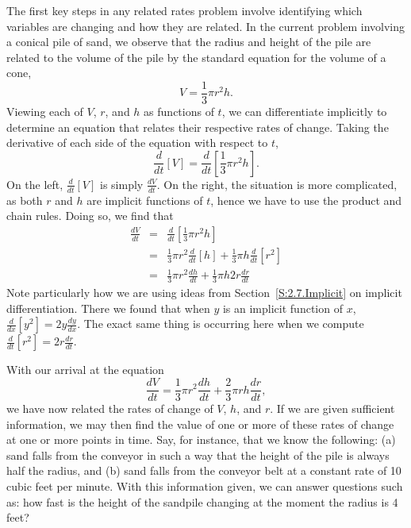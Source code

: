 The first key steps in any related rates problem involve identifying which variables are changing and how they are related.  In the current problem involving a conical pile of sand, we observe that the radius and height of the pile are related to the volume of the pile by the standard equation for the volume of a cone,
$$V = \frac{1}{3} \pi r^2 h.$$
Viewing each of $V$, $r$, and $h$ as functions of $t$, we can differentiate implicitly to determine an equation that relates their respective rates of change.  Taking the derivative of each side of the equation with respect to $t$, 
$$\frac{d}{dt}[V] = \frac{d}{dt}\left[\frac{1}{3} \pi r^2 h\right].$$
On the left, $\frac{d}{dt}[V]$ is simply $\frac{dV}{dt}$.  On the right, the situation is more complicated, as both $r$ and $h$ are implicit functions of $t$, hence we have to use the product and chain rules.  Doing so, we find that
\begin{eqnarray*}
\frac{dV}{dt} & = & \frac{d}{dt}\left[\frac{1}{3} \pi r^2 h\right] \\
		 & = & \frac{1}{3} \pi r^2 \frac{d}{dt}[h] + \frac{1}{3} \pi h \frac{d}{dt}[r^2] \\
		 & = & \frac{1}{3} \pi r^2 \frac{dh}{dt} + \frac{1}{3} \pi h 2r \frac{dr}{dt}
\end{eqnarray*}
Note particularly how we are using ideas from Section~\ref{S:2.7.Implicit} on implicit differentiation.  There we found that when $y$ is an implicit function of $x$, $\frac{d}{dx}[y^2] = 2y \frac{dy}{dx}$.  The exact same thing is occurring here when we compute $\frac{d}{dt}[r^2] = 2r \frac{dr}{dt}$.

With our arrival at the equation
$$
\frac{dV}{dt} = \frac{1}{3} \pi r^2 \frac{dh}{dt} + \frac{2}{3} \pi rh \frac{dr}{dt},
$$
we have now related the rates of change of $V$, $h$, and $r$.  If we are given sufficient information, we may then find the value of one or more of these rates of change at one or more points in time.  Say, for instance, that we know the following:  (a) sand falls from the conveyor in such a way that the height of the pile is always half the radius, and (b) sand falls from the conveyor belt at a constant rate of 10 cubic feet per minute.  With this information given, we can answer questions such as: how fast is the height of the sandpile changing at the moment the radius is 4 feet?

